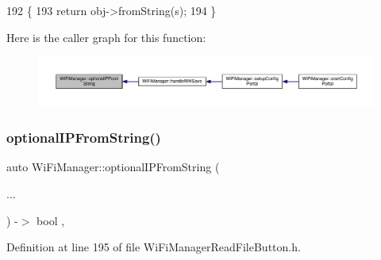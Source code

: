 \begin{DoxyCode}
192                                                                                          \{
193       \textcolor{keywordflow}{return}  obj->fromString(s);
194     \}
\end{DoxyCode}
Here is the caller graph for this function\+:
\nopagebreak
\begin{figure}[H]
\begin{center}
\leavevmode
\includegraphics[width=350pt]{d4/dc8/class_wi_fi_manager_a6a94f08eb43e0871932556a4ccfa11b7_icgraph}
\end{center}
\end{figure}
\mbox{\label{class_wi_fi_manager_aa248b818eee0423b14a88c637f7c4637}} 
\subsubsection{\texorpdfstring{optional\+I\+P\+From\+String()}{optionalIPFromString()}\hspace{0.1cm}{\footnotesize\ttfamily [2/2]}}
{\footnotesize\ttfamily auto Wi\+Fi\+Manager\+::optional\+I\+P\+From\+String (\begin{DoxyParamCaption}\item[{}]{... }\end{DoxyParamCaption}) -\/$>$ bool \hspace{0.3cm}{\ttfamily [inline]}, {\ttfamily [private]}}



Definition at line 195 of file Wi\+Fi\+Manager\+Read\+File\+Button.\+h.


